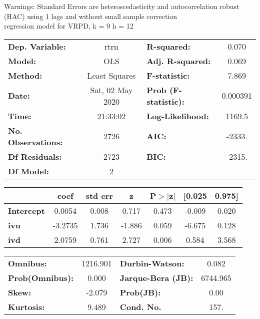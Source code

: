 Warnings: \newline
 [1] Standard Errors are heteroscedasticity and autocorrelation robust (HAC) using 1 lags and without small sample correction\\ 

regression model for VRPD, k = 9 h = 12\begin{center}
\begin{tabular}{lclc}
\toprule
\textbf{Dep. Variable:}    &       rtrn       & \textbf{  R-squared:         } &     0.070   \\
\textbf{Model:}            &       OLS        & \textbf{  Adj. R-squared:    } &     0.069   \\
\textbf{Method:}           &  Least Squares   & \textbf{  F-statistic:       } &     7.869   \\
\textbf{Date:}             & Sat, 02 May 2020 & \textbf{  Prob (F-statistic):} &  0.000391   \\
\textbf{Time:}             &     21:33:02     & \textbf{  Log-Likelihood:    } &    1169.5   \\
\textbf{No. Observations:} &        2726      & \textbf{  AIC:               } &    -2333.   \\
\textbf{Df Residuals:}     &        2723      & \textbf{  BIC:               } &    -2315.   \\
\textbf{Df Model:}         &           2      & \textbf{                     } &             \\
\bottomrule
\end{tabular}
\begin{tabular}{lcccccc}
                   & \textbf{coef} & \textbf{std err} & \textbf{z} & \textbf{P$> |$z$|$} & \textbf{[0.025} & \textbf{0.975]}  \\
\midrule
\textbf{Intercept} &       0.0054  &        0.008     &     0.717  &         0.473        &       -0.009    &        0.020     \\
\textbf{ivu}       &      -3.2735  &        1.736     &    -1.886  &         0.059        &       -6.675    &        0.128     \\
\textbf{ivd}       &       2.0759  &        0.761     &     2.727  &         0.006        &        0.584    &        3.568     \\
\bottomrule
\end{tabular}
\begin{tabular}{lclc}
\textbf{Omnibus:}       & 1216.901 & \textbf{  Durbin-Watson:     } &    0.082  \\
\textbf{Prob(Omnibus):} &   0.000  & \textbf{  Jarque-Bera (JB):  } & 6744.965  \\
\textbf{Skew:}          &  -2.079  & \textbf{  Prob(JB):          } &     0.00  \\
\textbf{Kurtosis:}      &   9.489  & \textbf{  Cond. No.          } &     157.  \\
\bottomrule
\end{tabular}
\end{center}

